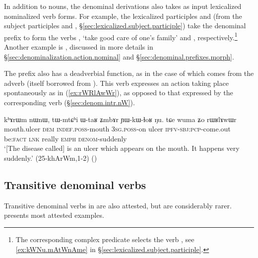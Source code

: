  
In addition to nouns, the  denominal derivations also takes as input lexicalized nominalized verb forms. For example, the lexicalized participles   and   (from the subject participles   and  , §\ref{sec:lexicalized.subject.participle}) take the  denominal prefix to form the verbs  , `take good care of one's family' and , respectively.\footnote{The corresponding complex predicate selects the verb , see \ref{ex:kWNu.mAtWnAme} in §\ref{sec:lexicalized.subject.participle}.} Another example is , discussed in more details in §\ref{sec:denominalization.action.nominal} and §\ref{sec:denominal.prefixes.morph}.
 
The  prefix also has a deadverbial function, as in the case of   which comes from the adverb  (itself borrowed from ). This verb expresses an action taking place spontaneously as in (\ref{ex:rWRlAwWr}), as opposed to that expressed by the corresponding  verb  (§\ref{sec:denom.intr.nW}).

\begin{exe}
\ex \label{ex:rWRlAwWr}
 \gll kʰɤrɯm nɯnɯ, tɯ-mtɕʰi ɯ-taʁ ʑmbɤr ɲɯ-kɯ-ɬoʁ ŋu. tɕe wuma ʑo rɯʁlɤwɯr    \\
mouth.ulcer \textsc{dem} \textsc{indef}.\textsc{poss}-mouth \textsc{3sg}.\textsc{poss}-on ulcer \textsc{ipfv}-\textsc{sbj}:\textsc{pcp}-come.out be:\textsc{fact} \textsc{lnk} really \textsc{emph} \textsc{denom}-suddenly  \\
\glt `[The disease called]  is an ulcer which appears on the mouth. It happens very suddenly.' (25-khArWm,1-2) ()
\end{exe}

\subsection{Transitive  denominal verbs}   \label{sec:denom.tr.rA}
Transitive denominal verbs in  are also attested, but are considerably rarer.  presents most attested examples.


